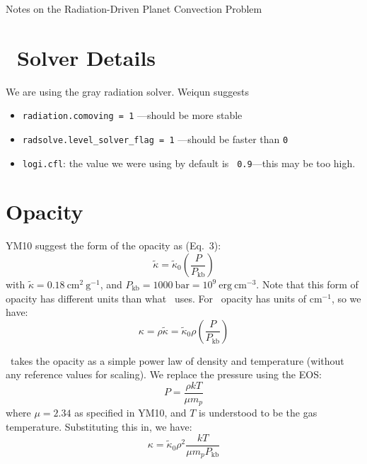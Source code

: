 \documentclass[11pt]{article}
\newcommand{\logi}{{\sffamily{Logi}}}
\begin{document}
\begin{center}
  {\Large Notes on the Radiation-Driven Planet Convection Problem}
\end{center}


\section{\logi\ Solver Details}

We are using the gray radiation solver.  Weiqun suggests
\begin{itemize}
\item {\tt radiation.comoving = 1} ---should be more stable
\item {\tt radsolve.level\_solver\_flag = 1} ---should be faster than {\tt 0}
\item {\tt logi.cfl}: the value we were using by default is {\tt
  0.9}---this may be too high.
\end{itemize}


\section{Opacity}

YM10 suggest the form of the opacity as (Eq.\ 3):
\begin{equation}
  \tilde{\kappa} = \tilde{\kappa}_0 \left (\frac{P}{P_\mathrm{kb}} \right)
\end{equation}
with $\tilde{\kappa} = 0.18~\mathrm{cm^2~g^{-1}}$, and $P_\mathrm{kb}
= 1000~\mathrm{bar} = 10^9~\mathrm{erg~cm^{-3}}$.  Note that this form
of opacity has different units than what \logi\ uses.  For \logi\,
opacity has units of $\mathrm{cm^{-1}}$, so we have:
\begin{equation}
  \kappa = \rho \tilde{\kappa} = \tilde{\kappa}_0 \rho \left ( \frac{P}{P_\mathrm{kb}} \right )
\end{equation}

\logi\ takes the opacity as a simple power law of density and temperature (without any
reference values for scaling).  We replace the pressure using the EOS:
\begin{equation}
  P = \frac{\rho k T}{\mu m_p}
\end{equation}
where $\mu = 2.34$ as specified in YM10, and $T$ is understood to be
the gas temperature.  Substituting this in, we have:
\begin{equation}
  \kappa = \tilde{\kappa}_0 \rho^2 \frac{k T}{\mu m_p P_\mathrm{kb}}
\end{equation}
\end{document}
